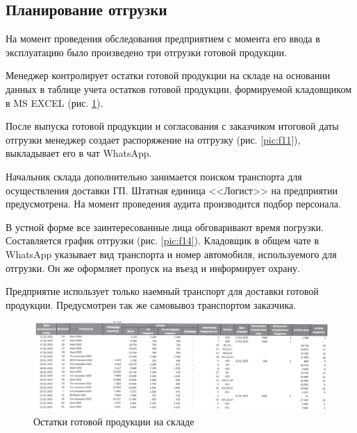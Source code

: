 \subsection{Планирование отгрузки}
\label{bp:ShipmentPlanning}

На момент проведения обследования предприятием с момента его ввода в эксплуатацию было произведено три отгрузки готовой продукции. 

Менеджер контролирует остатки готовой продукции на складе на основании данных в таблице учета остатков готовой продукции, формируемой кладовщиком в MS EXCEL (рис. \ref{pic:f10}).

После выпуска готовой продукции и согласования с заказчиком итоговой даты отгрузки менеджер создает распоряжение на отгрузку (рис. \ref{pic:f11}), выкладывает его в чат WhatsApp. 

Начальник склада дополнительно занимается поиском транспорта для осуществления доставки ГП. Штатная единица <<Логист>> на предприятии предусмотрена. На момент проведения аудита производится подбор персонала. 

В устной форме все заинтересованные лица обговаривают время погрузки. Составляется график отгрузки (рис. \ref{pic:f14}). 
Кладовщик в общем чате в WhatsApp указывает вид транспорта и номер автомобиля, используемого для отгрузки. Он же оформляет пропуск на въезд и информирует охрану.

Предприятие использует только наемный транспорт для доставки готовой продукции. Предусмотрен так же самовывоз транспортом заказчика.


\begin{figure}
\begin{center}
 \includegraphics[width=\linewidth, height=0.94\textheight, angle=90, keepaspectratio]{Pics/f10.jpg}
\end{center}
\caption{Остатки готовой продукции на складе}
\label{pic:f10}
\end{figure}

